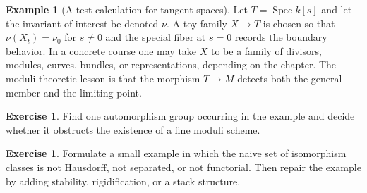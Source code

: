 \documentclass[11pt]{amsart}
\theoremstyle{definition}
\newtheorem{example}[theorem]{Example}
\newtheorem{exercise}[theorem]{Exercise}
\newcommand{\Spec}{\operatorname{Spec}}
\begin{document}
\begin{example}[A test calculation for tangent spaces]
Let $T=\Spec k[s]$ and let the invariant of interest be denoted $\nu$.  A toy family $X\to T$ is chosen so that $\nu(X_t)=\nu_0$ for $s\ne0$ and the special fiber at $s=0$ records the boundary behavior.  In a concrete course one may take $X$ to be a family of divisors, modules, curves, bundles, or representations, depending on the chapter.  The moduli-theoretic lesson is that the morphism $T\to M$ detects both the general member and the limiting point.
\end{example}
\begin{exercise}
Find one automorphism group occurring in the example and decide whether it obstructs the existence of a fine moduli scheme.
\end{exercise}
\begin{exercise}
Formulate a small example in which the naive set of isomorphism classes is not Hausdorff, not separated, or not functorial.  Then repair the example by adding stability, rigidification, or a stack structure.
\end{exercise}
\clearpage
\end{document}

